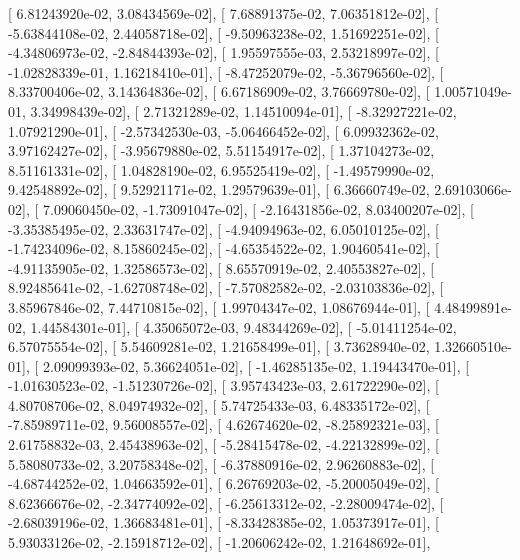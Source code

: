 \documentclass{article}
\begin{document}
       [  6.81243920e-02,   3.08434569e-02],
       [  7.68891375e-02,   7.06351812e-02],
       [ -5.63844108e-02,   2.44058718e-02],
       [ -9.50963238e-02,   1.51692251e-02],
       [ -4.34806973e-02,  -2.84844393e-02],
       [  1.95597555e-03,   2.53218997e-02],
       [ -1.02828339e-01,   1.16218410e-01],
       [ -8.47252079e-02,  -5.36796560e-02],
       [  8.33700406e-02,   3.14364836e-02],
       [  6.67186909e-02,   3.76669780e-02],
       [  1.00571049e-01,   3.34998439e-02],
       [  2.71321289e-02,   1.14510094e-01],
       [ -8.32927221e-02,   1.07921290e-01],
       [ -2.57342530e-03,  -5.06466452e-02],
       [  6.09932362e-02,   3.97162427e-02],
       [ -3.95679880e-02,   5.51154917e-02],
       [  1.37104273e-02,   8.51161331e-02],
       [  1.04828190e-02,   6.95525419e-02],
       [ -1.49579990e-02,   9.42548892e-02],
       [  9.52921171e-02,   1.29579639e-01],
       [  6.36660749e-02,   2.69103066e-02],
       [  7.09060450e-02,  -1.73091047e-02],
       [ -2.16431856e-02,   8.03400207e-02],
       [ -3.35385495e-02,   2.33631747e-02],
       [ -4.94094963e-02,   6.05010125e-02],
       [ -1.74234096e-02,   8.15860245e-02],
       [ -4.65354522e-02,   1.90460541e-02],
       [ -4.91135905e-02,   1.32586573e-02],
       [  8.65570919e-02,   2.40553827e-02],
       [  8.92485641e-02,  -1.62708748e-02],
       [ -7.57082582e-02,  -2.03103836e-02],
       [  3.85967846e-02,   7.44710815e-02],
       [  1.99704347e-02,   1.08676944e-01],
       [  4.48499891e-02,   1.44584301e-01],
       [  4.35065072e-03,   9.48344269e-02],
       [ -5.01411254e-02,   6.57075554e-02],
       [  5.54609281e-02,   1.21658499e-01],
       [  3.73628940e-02,   1.32660510e-01],
       [  2.09099393e-02,   5.36624051e-02],
       [ -1.46285135e-02,   1.19443470e-01],
       [ -1.01630523e-02,  -1.51230726e-02],
       [  3.95743423e-03,   2.61722290e-02],
       [  4.80708706e-02,   8.04974932e-02],
       [  5.74725433e-03,   6.48335172e-02],
       [ -7.85989711e-02,   9.56008557e-02],
       [  4.62674620e-02,  -8.25892321e-03],
       [  2.61758832e-03,   2.45438963e-02],
       [ -5.28415478e-02,  -4.22132899e-02],
       [  5.58080733e-02,   3.20758348e-02],
       [ -6.37880916e-02,   2.96260883e-02],
       [ -4.68744252e-02,   1.04663592e-01],
       [  6.26769203e-02,  -5.20005049e-02],
       [  8.62366676e-02,  -2.34774092e-02],
       [ -6.25613312e-02,  -2.28009474e-02],
       [ -2.68039196e-02,   1.36683481e-01],
       [ -8.33428385e-02,   1.05373917e-01],
       [  5.93033126e-02,  -2.15918712e-02],
       [ -1.20606242e-02,   1.21648692e-01],
\end{document}
